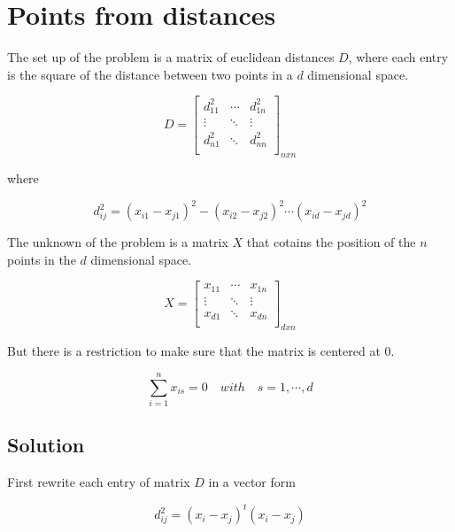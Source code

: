\documentclass{article}
\begin{document}
    \section{Points from distances}

    The set up of the problem is a matrix of euclidean distances $D$, where each
    entry is the square of the distance between two points in a $d$ dimensional
    space.

    \[
        D =
        \begin{bmatrix}
            d_{11}^2 & \cdots & d_{1n}^2\\
            \vdots   & \ddots & \vdots  \\
            d_{n1}^2 & \ddots & d_{nn}^2\\
        \end{bmatrix}_{n x n}
    \]

    where

    \begin{equation*}
        d_{ij}^2 = (x_{i1}-x_{j1})^2 - (x_{i2}-x_{j2})^2 \cdots (x_{id}-x_{jd})^2
    \end{equation*}

    The unknown of the problem is a matrix $X$ that cotains the position of the
    $n$ points in the $d$ dimensional space.

    \[
        X =
        \begin{bmatrix}
            x_{11} & \cdots & x_{1n}\\
            \vdots & \ddots & \vdots\\
            x_{d1} & \ddots & x_{dn}\\
        \end{bmatrix}_{d x n}
    \]

    But there is a restriction to make sure that the matrix is centered at 0.

    \begin{equation*} 
        \sum_{i=1}^n x_{is} = 0 \quad with \quad s = 1, \cdots, d
    \end{equation*} 

    \subsection{Solution}

    First rewrite each entry of matrix $D$ in a vector form

    \begin{equation*}
        d_{ij}^2 = (x_i-x_j)^t (x_i-x_j)
    \end{equation*}
\end{document}
